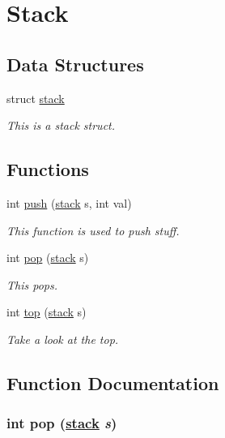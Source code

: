\hypertarget{group__stack}{
\section{Stack}
\label{group__stack}
}
\subsection*{Data Structures}
\begin{CompactItemize}
\item 
struct \hyperlink{structstack}{stack}
\begin{CompactList}\small\item\em This is a stack struct.\item\end{CompactList}\end{CompactItemize}
\subsection*{Functions}
\begin{CompactItemize}
\item 
int \hyperlink{group__stack_a0}{push} (\hyperlink{structstack}{stack} s, int val)
\begin{CompactList}\small\item\em This function is used to push stuff.\item\end{CompactList}\item 
int \hyperlink{group__stack_a1}{pop} (\hyperlink{structstack}{stack} s)
\begin{CompactList}\small\item\em This pops.\item\end{CompactList}\item 
int \hyperlink{group__stack_a2}{top} (\hyperlink{structstack}{stack} s)
\begin{CompactList}\small\item\em Take a look at the top.\item\end{CompactList}\end{CompactItemize}


\subsection{Function Documentation}
\hypertarget{group__stack_a1}{
\subsubsection[pop]{\setlength{\rightskip}{0pt plus 5cm}int pop (\hyperlink{structstack}{stack} {\em s})}}
\label{group__stack_a1}


